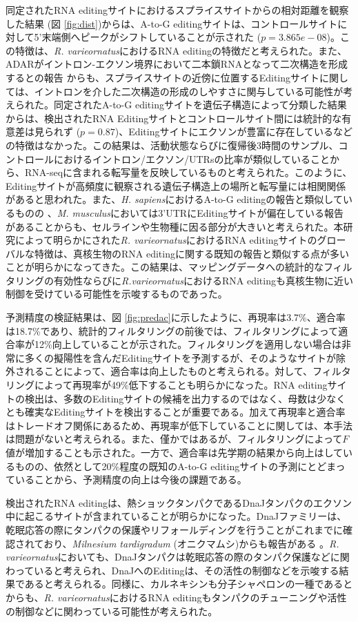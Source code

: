 \par
同定されたRNA editingサイトにおけるスプライスサイトからの相対距離を観察した結果 (図 \ref{fig:dist})からは、A-to-G editingサイトは、コントロールサイトに対して5'末端側へピークがシフトしていることが示された ($p=3.865e−08$)。この特徴は、{\it R. varieornatus}におけるRNA editingの特徴だと考えられた。また、ADARがイントロン-エクソン境界において二本鎖RNAとなって二次構造を形成するとの報告 \citep{pmid15920480}からも、スプライスサイトの近傍に位置するEditingサイトに関しては、イントロンを介した二次構造の形成のしやすさに関与している可能性が考えられた。同定されたA-to-G editingサイトを遺伝子構造によって分類した結果からは、検出されたRNA Editingサイトとコントロールサイト間には統計的な有意差は見られず ($p=0.87$)、Editingサイトにエクソンが豊富に存在しているなどの特徴はなかった。この結果は、活動状態ならびに復帰後3時間のサンプル、コントロールにおけるイントロン/エクソン/UTRsの比率が類似していることから、RNA-seqに含まれる転写量を反映しているものと考えられた。このように、Editingサイトが高頻度に観察される遺伝子構造上の場所と転写量には相関関係があると思われた。また、{\it H. sapiens}におけるA-to-G editingの報告と類似しているものの \citep{pmid22484847}、{\it M. musculus}においては3'UTRにEditingサイトが偏在している報告 \citep{pmid22448268}があることからも、セルラインや生物種に因る部分が大きいと考えられた。本研究によって明らかにされた{\it R. varieornatus}におけるRNA editingサイトのグローバルな特徴は、真核生物のRNA editingに関する既知の報告と類似する点が多いことが明らかになってきた。この結果は、マッピングデータへの統計的なフィルタリングの有効性ならびに{\it R.varieornatus}におけるRNA editingも真核生物に近い制御を受けている可能性を示唆するものであった。
\par
予測精度の検証結果は、図 \ref{fig:predac}に示したように、再現率は3.7\%、適合率は18.7\%であり、統計的フィルタリングの前後では、フィルタリングによって適合率が12\%向上していることが示された。フィルタリングを適用しない場合は非常に多くの擬陽性を含んだEditingサイトを予測するが、そのようなサイトが除外されることによって、適合率は向上したものと考えられる。対して、フィルタリングによって再現率が49\%低下することも明らかになった。RNA editingサイトの検出は、多数のEditingサイトの候補を出力するのではなく、母数は少なくとも確実なEditingサイトを検出することが重要である。加えて再現率と適合率はトレードオフ関係にあるため、再現率が低下していることに関しては、本手法は問題がないと考えられる。また、僅かではあるが、フィルタリングによって$F$値が増加することも示された。一方で、適合率は先学期の結果から向上はしているものの、依然として20\%程度の既知のA-to-G editingサイトの予測にとどまっていることから、予測精度の向上は今後の課題である。
\par
検出されたRNA editingは、熱ショックタンパクであるDnaJタンパクのエクソン中に起こるサイトが含まれていることが明らかになった。DnaJファミリーは、乾眠応答の際にタンパクの保護やリフォールディングを行うことがこれまでに確認されており、{\it Milnesium tardigradum} (オニクマムシ)からも報告がある \citep{milne}。{\it R. varieornatus}においても、DnaJタンパクは乾眠応答の際のタンパク保護などに関わっていると考えられ、DnaJへのEditingは、その活性の制御などを示唆する結果であると考えられる。同様に、カルネキシンも分子シャペロンの一種であるとからも、{\it R. varieornatus}におけるRNA editingもタンパクのチューニングや活性の制御などに関わっている可能性が考えられた。